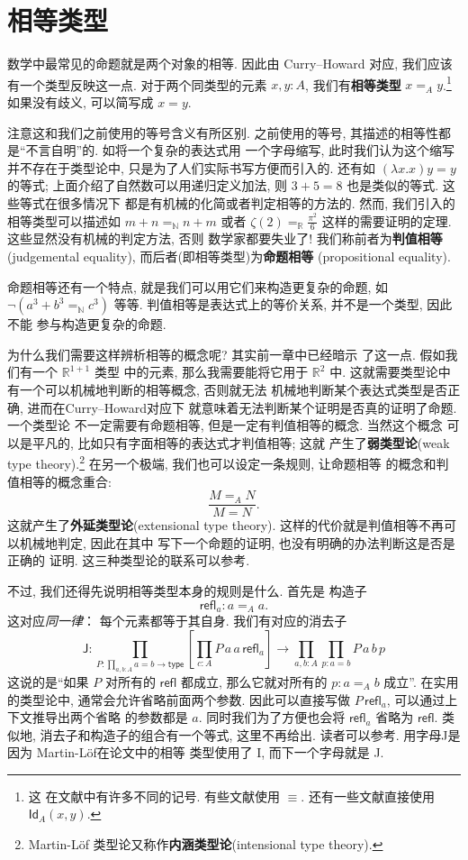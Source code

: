 \documentclass[UTF8]{ctexbook}
\newcommand{\cons}[1]{\textsf{#1}}
\theoremstyle{plain}
\theoremstyle{definition}
\theoremstyle{remark}
\begin{document}
\section{相等类型}
数学中最常见的命题就是两个对象的相等. 因此由 Curry--Howard
对应, 我们应该有一个类型反映这一点. 对于两个同类型的元素
\(x,y : A\), 我们有\textbf{相等类型} \(x =_A y\).\footnote{这
在文献中有许多不同的记号. 有些文献使用 \(\equiv\).
还有一些文献直接使用 \(\cons{Id}_A(x,y)\).}
如果没有歧义, 可以简写成 \(x = y\).

注意这和我们之前使用的等号含义有所区别. 之前使用的等号,
其描述的相等性都是“不言自明”的. 如将一个复杂的表达式用
一个字母缩写, 此时我们认为这个缩写并不存在于类型论中,
只是为了人们实际书写方便而引入的. 还有如 \((\lambda x.x)y = y\)
的等式; 上面介绍了自然数可以用递归定义加法, 则
\(3 + 5 = 8\) 也是类似的等式. 这些等式在很多情况下
都是有机械的化简或者判定相等的方法的. 然而, 我们引入的
相等类型可以描述如 \(m + n =_{\mathbb N} n + m\) 或者 \(\zeta(2) =_{\mathbb R} \frac{\pi^2}{6}\)
这样的需要证明的定理. 这些显然没有机械的判定方法, 否则
数学家都要失业了!
我们称前者为\textbf{判值相等} (judgemental equality),
而后者(即相等类型)为\textbf{命题相等} (propositional equality).

命题相等还有一个特点, 就是我们可以用它们来构造更复杂的命题,
如 \(\neg (a^3 + b^3 =_{\mathbb N} c^3)\) 等等.
判值相等是表达式上的等价关系, 并不是一个类型, 因此不能
参与构造更复杂的命题.

为什么我们需要这样辨析相等的概念呢? 其实前一章中已经暗示
了这一点. 假如我们有一个 \(\mathbb R^{1+1}\) 类型
中的元素, 那么我需要能将它用于 \(\mathbb R^2\) 中.
这就需要类型论中有一个可以机械地判断的相等概念, 否则就无法
机械地判断某个表达式类型是否正确, 进而在Curry--Howard对应下
就意味着无法判断某个证明是否真的证明了命题. 一个类型论
不一定需要有命题相等, 但是一定有判值相等的概念. 当然这个概念
可以是平凡的, 比如只有字面相等的表达式才判值相等; 这就
产生了\textbf{弱类型论}(weak type theory).\footnote{Martin-L\"of
类型论又称作\textbf{内涵类型论}(intensional
type theory).} 在另一个极端, 我们也可以设定一条规则, 让命题相等
的概念和判值相等的概念重合:
\[\frac{M =_A N}{M = N}.\]
这就产生了\textbf{外延类型论}(extensional type theory).
这样的代价就是判值相等不再可以机械地判定, 因此在其中
写下一个命题的证明, 也没有明确的办法判断这是否是正确的
证明. 这三种类型论的联系可以参考\cite{winterhalter:2018:ettwtt}.

不过, 我们还得先说明相等类型本身的规则是什么. 首先是
构造子
\[\cons{refl}_a : a =_A a.\]
这对应\emph{同一律}： 每个元素都等于其自身.
我们有对应的消去子
\[\cons{J} :
\prod_{P : \prod_{a,b:A} a = b \to \cons{type}}
\left[\prod_{c : A} P\,a\,a\,\cons{refl}_a\right] \to \prod_{a,b:A}\prod_{p : a=b} P\,a\,b\,p\]
这说的是“如果 \(P\) 对所有的 \(\cons{refl}\) 都成立,
那么它就对所有的 \(p : a=_A b\) 成立”.
在实用的类型论中, 通常会允许省略前面两个参数. 因此可以直接写做
\(P\,\cons{refl}_a\), 可以通过上下文推导出两个省略
的参数都是 \(a\). 同时我们为了方便也会将
\(\cons{refl}_a\) 省略为 \(\cons{refl}\).
类似地, 消去子和构造子的组合有一个等式, 这里不再给出.
读者可以参考\cite{ufp:2013:hottbook}. 用字母J是因为
Martin-L\"of在论文\cite{martinlof:1984:J}中的相等
类型使用了 I, 而下一个字母就是 J.
\end{document}
